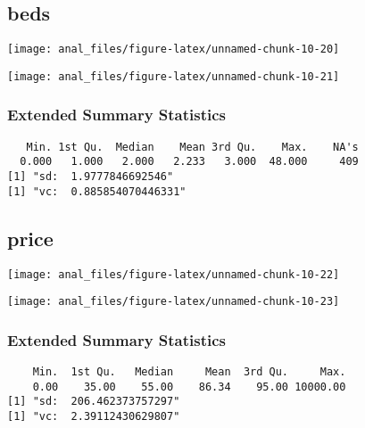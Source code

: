 \pagebreak

\hypertarget{beds}{%
\subsection{beds}\label{beds}}

\begin{center}\texttt{[image: anal\_files/figure-latex/unnamed-chunk-10-20]} \end{center}

\begin{center}\texttt{[image: anal\_files/figure-latex/unnamed-chunk-10-21]} \end{center}

\hypertarget{extended-summary-statistics-3}{%
\subsubsection{Extended Summary
Statistics}\label{extended-summary-statistics-3}}

\begin{verbatim}   Min. 1st Qu.  Median    Mean 3rd Qu.    Max.    NA's 
  0.000   1.000   2.000   2.233   3.000  48.000     409 
[1] "sd:  1.9777846692546"
[1] "vc:  0.885854070446331"
\end{verbatim}

\pagebreak

\hypertarget{price}{%
\subsection{price}\label{price}}

\begin{center}\texttt{[image: anal\_files/figure-latex/unnamed-chunk-10-22]} \end{center}

\begin{center}\texttt{[image: anal\_files/figure-latex/unnamed-chunk-10-23]} \end{center}

\hypertarget{extended-summary-statistics-4}{%
\subsubsection{Extended Summary
Statistics}\label{extended-summary-statistics-4}}

\begin{verbatim}    Min.  1st Qu.   Median     Mean  3rd Qu.     Max. 
    0.00    35.00    55.00    86.34    95.00 10000.00 
[1] "sd:  206.462373757297"
[1] "vc:  2.39112430629807"
\end{verbatim}

